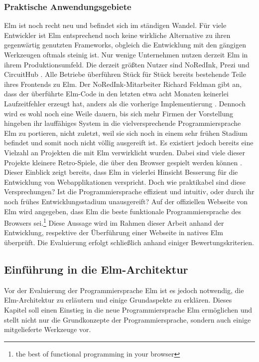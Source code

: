 \subsubsection{Praktische Anwendungsgebiete}
\label{sec:Praktische Anwendungsgebiete}
Elm ist noch recht neu und befindet sich im ständigen Wandel. Für viele Entwickler ist Elm entsprechend noch keine wirkliche Alternative zu ihren gegenwärtig genutzten Frameworks, obgleich die Entwicklung mit den gängigen Werkzeugen oftmals steinig ist. Nur wenige Unternehmen nutzen derzeit Elm in ihrem Produktionsumfeld. Die derzeit größten Nutzer sind NoRedInk, Prezi und CircuitHub \cite[Vgl.]{elm-no-runtime-errors}. Alle Betriebe überführen Stück für Stück bereits bestehende Teile ihres Frontends zu Elm. Der NoRedInk-Mitarbeiter Richard Feldman gibt an, dass der überführte Elm-Code in den letzten etwa acht Monaten keinerlei Laufzeitfehler erzeugt hat, anders als die vorherige Implementierung \cite[Vgl.]{feldman-no-errors}.
Dennoch wird es wohl noch eine Weile dauern, bis sich mehr Firmen der Vorstellung hingeben ihr lauffähiges System in die vielversprechende Programmiersprache Elm zu portieren, nicht zuletzt, weil sie sich noch in einem sehr frühen Stadium befindet und somit noch nicht völlig ausgereift ist.
Es existiert jedoch bereits eine Vielzahl an Projekten die mit Elm verwirklicht wurden. Dabei sind viele dieser Projekte kleinere Retro-Spiele, die über den Browser gespielt werden können \cite[vgl.]{builtwithelm}.
Dieser Einblick zeigt bereits, dass Elm in vielerlei Hinsicht Besserung für die Entwicklung von Webapplikationen verspricht. Doch wie praktikabel sind diese Versprechungen? Ist die Programmiersprache effizient und intuitiv, oder durch ihr noch frühes Entwicklungsstadium unausgereift?
Auf der offiziellen Webseite von Elm wird angegeben, dass Elm die beste funktionale Programmiersprache des Browsers sei.\footnote{\glqq the best of functional programming in your browser\grqq\cite[Vgl. Eigene Übersetzung]{elm-no-runtime-errors}}
Diese Aussage wird im Rahmen dieser Arbeit anhand der Entwicklung, respektive der Überführung einer Webseite in natives Elm überprüft. Die Evaluierung erfolgt schließlich anhand einiger Bewertungskriterien.

\subsection{Einführung in die Elm-Architektur}
\label{sec:elm-architektur}
Vor der Evaluierung der Programmiersprache Elm ist es jedoch notwendig, die Elm-Architektur zu erläutern und einige Grundaspekte zu erklären. Dieses Kapitel soll einen Einstieg in die neue Programmiersprache Elm ermöglichen und stellt nicht nur die Grundkonzepte der Programmiersprache, sondern auch einige mitgelieferte Werkzeuge vor.

